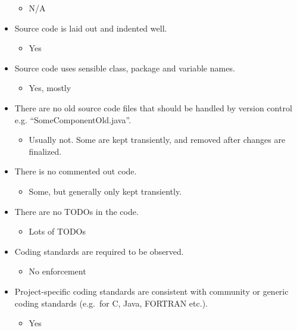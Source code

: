 \begin{itemize}
  \begin{itemize}
  \itemsep1pt\parskip0pt
  \item
    N/A
  \end{itemize}
\item
  Source code is laid out and indented well.

  \begin{itemize}
  \itemsep1pt\parskip0pt
  \item
    Yes
  \end{itemize}
\item
  Source code uses sensible class, package and variable names.

  \begin{itemize}
  \itemsep1pt\parskip0pt
  \item
    Yes, mostly
  \end{itemize}
\item
  There are no old source code files that should be handled by version
  control e.g. ``SomeComponentOld.java''.

  \begin{itemize}
  \itemsep1pt\parskip0pt
  \item
    Usually not. Some are kept transiently, and removed after changes
    are finalized.
  \end{itemize}
\item
  There is no commented out code.

  \begin{itemize}
  \itemsep1pt\parskip0pt
  \item
    Some, but generally only kept transiently.
  \end{itemize}
\item
  There are no TODOs in the code.

  \begin{itemize}
  \itemsep1pt\parskip0pt
  \item
    Lots of TODOs
  \end{itemize}
\item
  Coding standards are required to be observed.

  \begin{itemize}
  \itemsep1pt\parskip0pt
  \item
    No enforcement
  \end{itemize}
\item
  Project-specific coding standards are consistent with community or
  generic coding standards (e.g.~for C, Java, FORTRAN etc.).

  \begin{itemize}
  \itemsep1pt\parskip0pt
  \item
    Yes
  \end{itemize}
\end{itemize}

